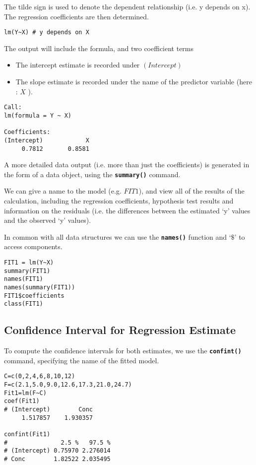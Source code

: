 \documentclass[a4paper,12pt]{article}
\begin{document}
The tilde sign is used to denote the dependent relationship (i.e. y depends on x). The regression coefficients are then determined.

\begin{framed}
\begin{verbatim}
lm(Y~X) # y depends on X
\end{verbatim}
\end{framed}

The output will include the formula, and two coefficient terms
\begin{itemize}
\item The intercept estimate is recorded under $(Intercept)$
\item The slope estimate is recorded under the name of the predictor variable (here : $X$ ).
\end{itemize}	
	
\begin{verbatim}
Call:
lm(formula = Y ~ X)

Coefficients:
(Intercept)            X
     0.7812       0.8581
\end{verbatim}

A more detailed data output (i.e. more than just the coefficients) is generated in the form of a data object, using the \textbf{\texttt{summary()}} command.

We can give a name to the model (e.g. $FIT1$), and view all of the results of the calculation, including the regression coefficients, hypothesis test results and information on the residuals (i.e. the differences between the estimated ‘y’ values and the observed ‘y’ values).

In common with all data structures we can use the \textbf{\texttt{names()}} function and ‘$\$$’ to access components.

\begin{framed}
\begin{verbatim}
FIT1 = lm(Y~X)
summary(FIT1)
names(FIT1)
names(summary(FIT1))
FIT1$coefficients
class(FIT1)
\end{verbatim}
\end{framed}
\newpage
\subsection{Confidence Interval for Regression Estimate}
To compute the confidence intervals for both estimates, we use the \texttt\textbf{{confint()}} command, specifying the name of the fitted model.
\begin{framed}
\begin{verbatim}
C=c(0,2,4,6,8,10,12)
F=c(2.1,5.0,9.0,12.6,17.3,21.0,24.7)
Fit1=lm(F~C)
coef(Fit1)
# (Intercept)        Conc
     1.517857    1.930357

confint(Fit1)
#               2.5 %   97.5 %
# (Intercept) 0.75970 2.276014
# Conc        1.82522 2.035495
\end{verbatim}
\end{framed}
\end{document}
